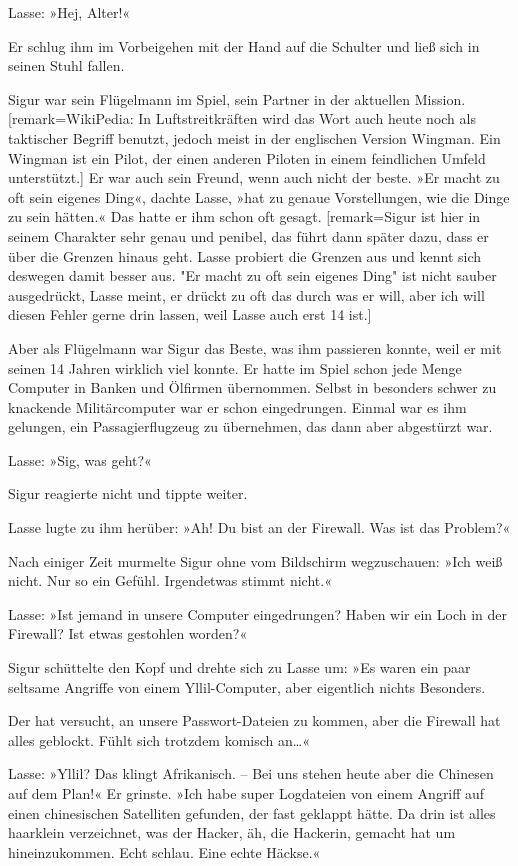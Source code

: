 Lasse: »Hej, Alter!«

Er schlug ihm im Vorbeigehen mit der Hand auf die Schulter und ließ sich in seinen Stuhl fallen.

Sigur war sein Flügelmann im Spiel, sein Partner in der aktuellen Mission. [remark={WikiPedia: In Luftstreitkräften wird das Wort auch heute noch als taktischer Begriff benutzt, jedoch meist in der englischen Version Wingman. Ein Wingman ist ein Pilot, der einen anderen Piloten in einem feindlichen Umfeld unterstützt.}]
Er war auch sein Freund, wenn auch nicht der beste.
»Er macht zu oft sein eigenes Ding«, dachte Lasse, »hat zu genaue Vorstellungen, wie die Dinge zu sein hätten.«
Das hatte er ihm  schon oft gesagt.
[remark={Sigur ist hier in seinem Charakter sehr genau und penibel, das führt dann später dazu, dass er über die Grenzen hinaus geht. Lasse probiert die Grenzen aus und kennt sich deswegen damit besser aus. "Er macht zu oft sein eigenes Ding" ist nicht sauber ausgedrückt, Lasse meint, er drückt zu oft das durch was er will, aber ich will diesen Fehler gerne drin lassen, weil Lasse auch erst 14 ist.}]

Aber als Flügelmann war Sigur das Beste, was ihm passieren konnte, weil er mit seinen 14 Jahren wirklich viel konnte.
Er hatte im Spiel schon jede Menge Computer in Banken und Ölfirmen übernommen. Selbst in besonders schwer zu knackende Militärcomputer war er schon eingedrungen.
Einmal war es ihm gelungen, ein Passagierflugzeug zu übernehmen, das dann aber abgestürzt war.

Lasse: »Sig, was geht?«

Sigur reagierte nicht und tippte weiter.

Lasse lugte zu ihm herüber: »Ah! Du bist an der Firewall.
Was ist das Problem?«

Nach einiger Zeit murmelte Sigur ohne vom Bildschirm wegzuschauen: »Ich weiß nicht.
Nur so ein Gefühl.
Irgendetwas stimmt nicht.«

Lasse: »Ist jemand in unsere Computer eingedrungen?
Haben wir ein Loch in der Firewall?
Ist etwas gestohlen worden?«

Sigur schüttelte den Kopf und drehte sich zu Lasse um: »Es waren ein paar seltsame Angriffe von einem Yllil-Computer, aber eigentlich nichts Besonders.

Der hat versucht, an unsere Passwort-Dateien zu kommen, aber die Firewall hat alles geblockt.
Fühlt sich trotzdem komisch an…«

Lasse: »Yllil? Das klingt Afrikanisch.
– Bei uns stehen heute aber die Chinesen auf dem Plan!« Er grinste.
»Ich habe super Logdateien von einem Angriff auf einen chinesischen Satelliten gefunden, der fast geklappt hätte.
Da drin ist alles haarklein verzeichnet, was der Hacker, äh, die Hackerin, gemacht hat um hineinzukommen.
Echt schlau.
Eine echte Häckse.« 

